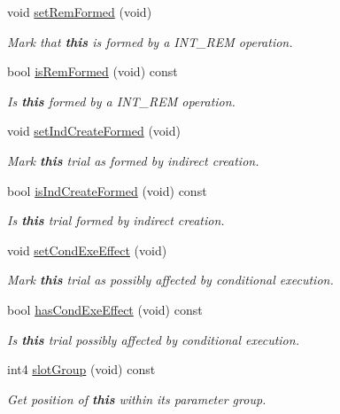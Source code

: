 \begin{DoxyCompactItemize}
void \mbox{\hyperlink{class_param_trial_a3fa95bb637e208d366f70cecaa6c331d}{set\+Rem\+Formed}} (void)
\begin{DoxyCompactList}\small\item\em Mark that {\bfseries{this}} is formed by a I\+N\+T\+\_\+\+R\+EM operation. \end{DoxyCompactList}\item 
bool \mbox{\hyperlink{class_param_trial_a997491aac899992e8b17459b06af0149}{is\+Rem\+Formed}} (void) const
\begin{DoxyCompactList}\small\item\em Is {\bfseries{this}} formed by a I\+N\+T\+\_\+\+R\+EM operation. \end{DoxyCompactList}\item 
void \mbox{\hyperlink{class_param_trial_a6a4ace8cab74a380e92b62505c70046a}{set\+Ind\+Create\+Formed}} (void)
\begin{DoxyCompactList}\small\item\em Mark {\bfseries{this}} trial as formed by {\itshape indirect} {\itshape creation}. \end{DoxyCompactList}\item 
bool \mbox{\hyperlink{class_param_trial_a70fbfc1bdd9e76295700b6b45f86f7da}{is\+Ind\+Create\+Formed}} (void) const
\begin{DoxyCompactList}\small\item\em Is {\bfseries{this}} trial formed by {\itshape indirect} {\itshape creation}. \end{DoxyCompactList}\item 
void \mbox{\hyperlink{class_param_trial_a32ff81889bdb636331549123ac1ca2e6}{set\+Cond\+Exe\+Effect}} (void)
\begin{DoxyCompactList}\small\item\em Mark {\bfseries{this}} trial as possibly affected by conditional execution. \end{DoxyCompactList}\item 
bool \mbox{\hyperlink{class_param_trial_a89e3ae18b8365695196d1202d3851e98}{has\+Cond\+Exe\+Effect}} (void) const
\begin{DoxyCompactList}\small\item\em Is {\bfseries{this}} trial possibly affected by conditional execution. \end{DoxyCompactList}\item 
int4 \mbox{\hyperlink{class_param_trial_a827f24578c88cbcd001d49ac820c12c2}{slot\+Group}} (void) const
\begin{DoxyCompactList}\small\item\em Get position of {\bfseries{this}} within its parameter {\itshape group}. \end{DoxyCompactList}\item 

\end{DoxyCompactItemize}
